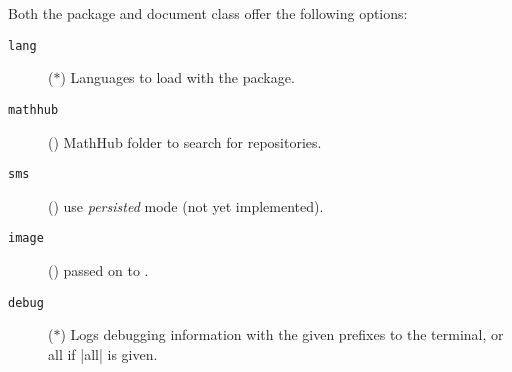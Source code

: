 Both the  package and document class offer the following
options:

\begin{description}
   \item[\texttt{lang}] ($\ast$) Languages
     to load with the  package.
   \item[\texttt{mathhub}] () MathHub folder
     to search for repositories.
   \item[\texttt{sms}] () use \emph{persisted}
     mode (not yet implemented).
   \item[\texttt{image}] () passed on to
     .
   \item[\texttt{debug}] ($\ast$) Logs debugging
     information with the given prefixes to the terminal,
     or all if |all| is given.
\end{description}